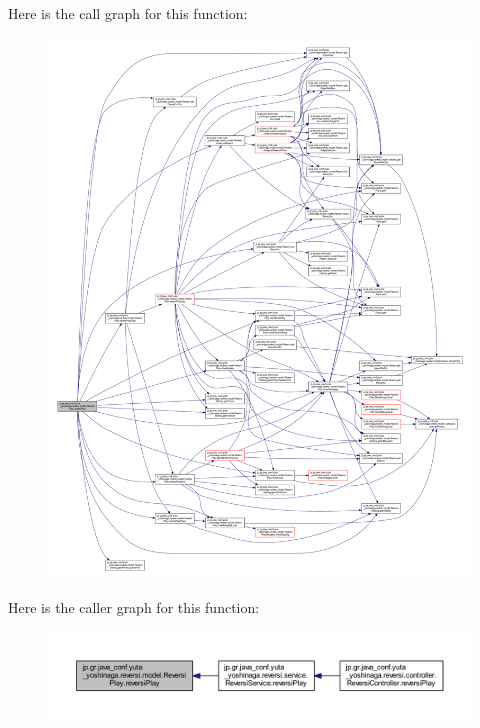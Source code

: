 Here is the call graph for this function\+:
\nopagebreak
\begin{figure}[H]
\begin{center}
\leavevmode
\includegraphics[width=350pt]{classjp_1_1gr_1_1java__conf_1_1yuta__yoshinaga_1_1reversi_1_1model_1_1_reversi_play_ac2fb56755f7f7d7ab0675035e8581ab1_cgraph}
\end{center}
\end{figure}
Here is the caller graph for this function\+:
\nopagebreak
\begin{figure}[H]
\begin{center}
\leavevmode
\includegraphics[width=350pt]{classjp_1_1gr_1_1java__conf_1_1yuta__yoshinaga_1_1reversi_1_1model_1_1_reversi_play_ac2fb56755f7f7d7ab0675035e8581ab1_icgraph}
\end{center}
\end{figure}
\mbox{\label{classjp_1_1gr_1_1java__conf_1_1yuta__yoshinaga_1_1reversi_1_1model_1_1_reversi_play_a1b1b5c91163c374bc2e0bf23ff922617}} 
